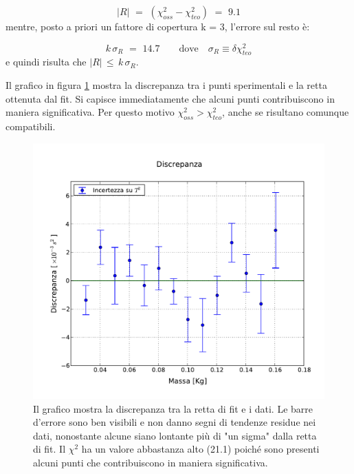 \begin{equation*}
	|R| \,\,=\,\, (\chi_{oss}^2 - \chi_{teo}^2) \,\,=\,\, 9.1
\end{equation*}
%
mentre, posto a priori un fattore di copertura k = 3, l'errore sul resto è:

\begin{equation*}
    k \, \sigma_{R} \,\,=\,\, 14.7 \qquad \text{dove} \quad \sigma_{R} \equiv \delta\chi_{teo}^2
\end{equation*}
%
e quindi risulta che $|R| \, \leq \, k \, \sigma_{R}$.

Il grafico in figura \ref{fig:discrepanza_dinamico} mostra la
discrepanza tra i punti sperimentali e la retta ottenuta dal fit. Si capisce immediatamente che alcuni punti contribuiscono
in maniera significativa. Per questo motivo $\chi^2_{oss} > \chi^2_{teo}$, anche se risultano comunque compatibili.

\begin{figure}
    \centering
    \includegraphics[width=120mm]{immagini/discrepanza_dinamico.pdf}
    \caption{Il grafico mostra la discrepanza tra la retta di fit e i dati. Le barre d'errore sono ben visibili
        e non danno segni di tendenze residue nei dati, nonostante alcune siano lontante più di "un sigma" dalla retta di fit.
        Il $\chi^2$ ha un valore abbastanza alto (21.1) poiché sono presenti alcuni punti che contribuiscono in maniera significativa.}
    \label{fig:discrepanza_dinamico}
\end{figure}

